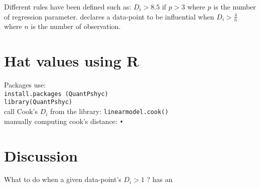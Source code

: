 \documentclass{article}[16pt]
\begin{document}
Different rules have  been defined such as: $D_i > 8.5$ if $p > 3$ \citep{barry}   where $p$ is the number of regression parameter. \citep{Robert} declares a data-point to be influential when $D_i > \frac{4}{n}$ where $n$ is the number of observation.
\section{Hat values using R}
Packages use:\\ 
\texttt{install.packages (QuantPshyc)}\\
\texttt{library(QuantPshyc)}\\
call Cook's $D_i$ from the library: \texttt{linearmodel.cook()}\\
manually computing cook's distance: \texttt{•}
\section{Discussion}
What to do when a given data-point's $D_i > 1$ ? has an 


\bigskip




\end{document}
